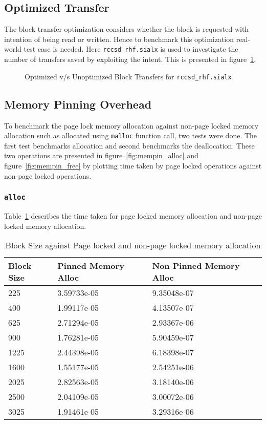 \subsection{Optimized Transfer}
The block transfer optimization considers whether the block is requested with
intention of being read or written. Hence to benchmark this optimization real-world
test case is needed. Here \texttt{rccsd\_rhf.sialx} is used to investigate the
number of transfers saved by exploiting the intent. This is presented in
figure~\ref{fig:optimized_block_transfer}.

\begin{figure}[h]
  
  \caption{Optimized v/s Unoptimized Block Transfers for \texttt{rccsd\_rhf.sialx}}
  \label{fig:optimized_block_transfer}
\end{figure}

\subsection{Memory Pinning Overhead}
To benchmark the page lock memory allocation against non-page locked memory allocation
such as allocated using \texttt{malloc} function call, two tests were done. The
first test benchmarks allocation and second benchmarks the deallocation. These two
operations are presented in figure~\ref{fig:mempin_alloc} and figure~\ref{fig:mempin_free}
by plotting time taken by page locked operations against non-page locked operations.

\subsubsection{\texttt{alloc}}
Table~\ref{tab:mempin_alloc} describes the time taken for page locked memory allocation
and non-page locked memory allocation.
\begin{table}[h]
  \centering
  \begin{tabular}{l | l | l}
    \hline
    Block Size & Pinned Memory Alloc & Non Pinned Memory Alloc \\
    \hline
    225        & 3.59733e-05         & 9.35048e-07             \\
    400        & 1.99117e-05         & 4.13507e-07             \\
    625        & 2.71294e-05         & 2.93367e-06             \\
    900        & 1.76281e-05         & 5.90459e-07             \\
    1225       & 2.44398e-05         & 6.18398e-07             \\
    1600       & 1.55177e-05         & 2.54251e-06             \\
    2025       & 2.82563e-05         & 3.18140e-06             \\
    2500       & 2.04109e-05         & 3.00072e-06             \\
    3025       & 1.91461e-05         & 3.29316e-06             \\
    \hline
  \end{tabular}
  \caption{Block Size against Page locked and non-page locked memory allocation}
  \label{tab:mempin_alloc}
\end{table}

